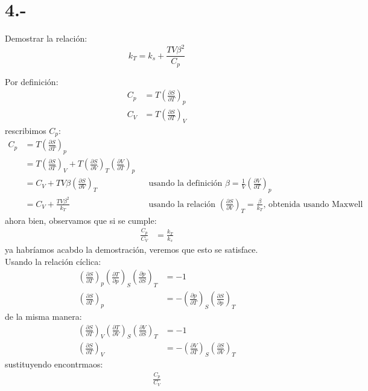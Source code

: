 \documentclass{article}
\begin{document}
\section*{4.-}
Demostrar la relación:
\[ k_T = k_s + \frac{TV\beta^2}{C_p} \]
\begin{tcolorbox}[breakable]
    Por definición:
    \begin{align*}
        C_p &= T(\tfrac{\partial S}{\partial T})_p \\
        C_V &= T(\tfrac{\partial S}{\partial T})_V
    \end{align*}
    rescribimos $C_p$:
    \begin{align*}
        C_p 
        &= T(\tfrac{\partial S}{\partial T})_p \\
        &= T(\tfrac{\partial S}{\partial T})_V + T(\tfrac{\partial S}{\partial V})_T (\tfrac{\partial V}{\partial T})_p \\
        &= C_V + TV\beta(\tfrac{\partial S}{\partial V})_T && \text{usando la definición $\beta = \tfrac{1}{V}(\tfrac{\partial V}{\partial T})_p$} \\
        &= C_V + \tfrac{TV\beta^2}{k_T} && \text{usando la relación $(\tfrac{\partial S}{\partial V})_T = \tfrac{\beta}{k_T}$, obtenida usando Maxwell}
    \end{align*}
    ahora bien, observamos que si se cumple:
    \begin{align*}
        \frac{C_p}{C_V} &= \frac{k_T}{k_s}
    \end{align*}
    ya habríamos acabdo la demostración, veremos que esto se satisface. \\
    Usando la relación cíclica:
    \begin{align*}
        (\tfrac{\partial S}{\partial T})_p (\tfrac{\partial T}{\partial p})_S (\tfrac{\partial p}{\partial S})_T &= -1 \\
        (\tfrac{\partial S}{\partial T})_p &= -(\tfrac{\partial p}{\partial T})_S (\tfrac{\partial S}{\partial p})_T
    \end{align*}
    de la misma manera:
    \begin{align*}
        (\tfrac{\partial S}{\partial T})_V(\tfrac{\partial T}{\partial V})_S (\tfrac{\partial V}{\partial S})_T &= -1 \\
        (\tfrac{\partial S}{\partial T})_V &= -(\tfrac{\partial V}{\partial T})_S (\tfrac{\partial S}{\partial V})_T
    \end{align*}
    sustituyendo encontrmaos:
    \begin{align*}
        \tfrac{C_p}{C_V}

\end{align*}
\end{tcolorbox}
\end{document}
